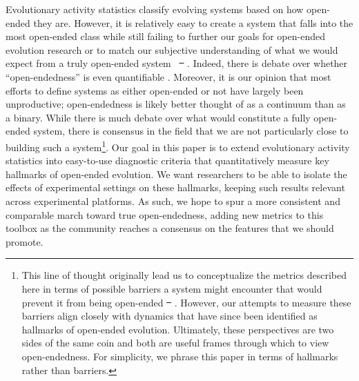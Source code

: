 \documentclass[letterpaper]{article}
\providecommand{\DIFaddtex}[1]{{\protect\color{blue}\uwave{#1}}} %
\providecommand{\DIFdeltex}[1]{{\protect\color{red}\sout{#1}}}                      %
\providecommand{\DIFaddbegin}{} %
\providecommand{\DIFaddend}{} %
\providecommand{\DIFdelbegin}{} %
\providecommand{\DIFdelend}{} %
\providecommand{\DIFadd}[1]{\texorpdfstring{\DIFaddtex{#1}}{#1}} %
\providecommand{\DIFdel}[1]{\texorpdfstring{\DIFdeltex{#1}}{}} %
\begin{document}
Evolutionary activity statistics classify evolving systems based on how open-ended they are. However, it is relatively easy to create a system that falls into the most open-ended class while still failing to further our goals for open-ended evolution research or to match our subjective understanding of what we would expect from a truly open-ended system ~\DIFdelbegin \DIFdel{\mbox{%
\cite{maley_four_1999}}\hspace{0pt}%
}\DIFdelend \DIFaddbegin \DIFadd{\mbox{%
\citep{maley_four_1999}}\hspace{0pt}%
}\DIFaddend . Indeed, there is debate over whether ``open-endedness'' is even quantifiable \citep{stanley_role_2016}. Moreover, it is our opinion that most efforts to define systems as either open-ended or not have largely been unproductive; open-endedness is likely better thought of as a continuum than as a binary. While there is much debate over what would constitute a fully open-ended system, there is consensus in the field that we are not particularly close to building such a system\footnote{This line of thought originally lead us to conceptualize the metrics described here in terms of possible barriers a system might encounter that would prevent it from being open-ended \DIFdelbegin \DIFdel{\mbox{%
\citep{blogpost}}\hspace{0pt}%
}\DIFdelend \DIFaddbegin \DIFadd{\mbox{%
\citep{dolson_whats_2015}}\hspace{0pt}%
}\DIFaddend . However, our attempts to measure these barriers align closely with dynamics that have since been identified as hallmarks of open-ended evolution. Ultimately, these perspectives are two sides of the same coin and both are useful frames through which to view open-endedness. For simplicity, we phrase this paper in terms of hallmarks rather than barriers.}. 
Our goal in this paper is to extend evolutionary activity statistics into easy-to-use diagnostic criteria that quantitatively measure key hallmarks of open-ended evolution.  We want researchers to be able to isolate the effects of experimental settings on these hallmarks, keeping such results relevant across experimental platforms. As such, we hope to spur a more consistent and comparable march toward true open-endedness, adding new metrics to this toolbox as the community reaches a consensus on the features that we should promote.
\end{document}

